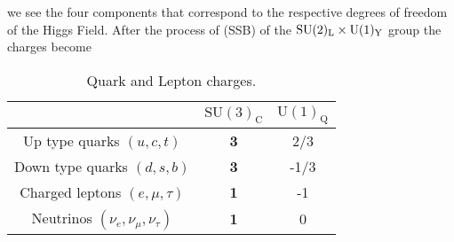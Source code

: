 %
%
 we see the four components that correspond to the respective degrees of freedom of the Higgs Field.
% 
After the process of  (SSB) of the $\mathrm{SU(2)_L} \times \mathrm{U}(1)_{\mathrm{Y}}$ group the charges  become 
%
\begin{table}[H]\label{tab:Charges_post_SSB}
\caption{Quark and Lepton charges. }
\centering
\begin{tabular}{ccc}
  \hline & $\mathrm{SU(3)_C}$ & $\mathrm{U(1)_Q}$ \\
  \hline 
Up type quarks $(u,c,t)$ & \textbf{3} & 2/3 \\
Down type quarks $(d,s,b)$ & \textbf{3} & -1/3 \\
Charged leptons $(e,\mu,\tau)$ & \textbf{1} & -1 \\
Neutrinos  $(\nu_e,\nu_\mu,\nu_\tau)$  & \textbf{1} & 0 \\
  \hline	
\end{tabular}
\end{table}

